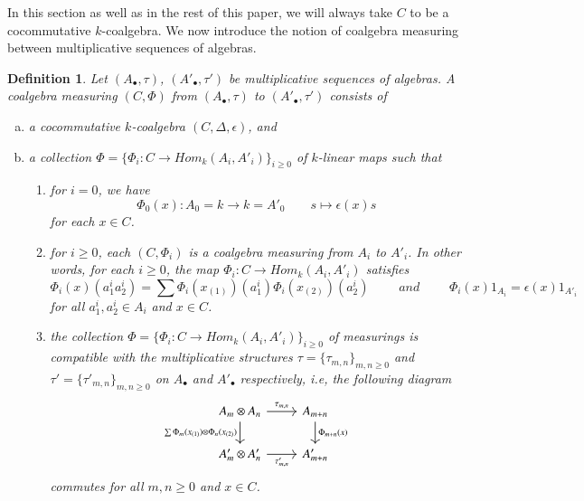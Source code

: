 \documentclass[10pt, colorlinks]{article}
\numberwithin{equation}{section} \DeclareMathSizes{2}{10}{12}{13}
\newtheorem{defn}[thm]{Definition}
\begin{document}
    \smallskip
    In this section as well as in the rest of this paper, we will always take $C$ to be a cocommutative $k$-coalgebra. We now introduce the notion of coalgebra measuring between multiplicative sequences of algebras. 


    \begin{defn}\label{D3.r1}
        Let $(A_\bullet,\tau)$, $(A'_\bullet,\tau')$ be multiplicative sequences of algebras. A coalgebra measuring $(C,\Phi)$ from $(A_\bullet,\tau)$ to $(A'_\bullet,\tau')$ consists of 
        \begin{enumerate}[(a)]
            \item a cocommutative $k$-coalgebra $(C,\Delta,\epsilon)$, and
            \item a collection $\Phi=\{\Phi_i: C\longrightarrow  {Hom}_k(A_i,A'_i)\}_{i\geq 0}$ of $k$-linear maps such that 
            
            \begin{enumerate}[(1)]
            
            
            \item for $i=0$, we have
            \begin{equation}\label{ut}
            \Phi_0(x):A_0=k\longrightarrow k=A'_0\qquad s\mapsto \epsilon(x)s
            \end{equation} for each $x\in C$. 
            
            \item for $i\geq 0$, each $(C,\Phi_i)$ is a coalgebra measuring from $A_i$ to $A'_i$. In other words, for each $i\geq0$, the map $\Phi_i:C\longrightarrow  {Hom}_k(A_i,A'_i)$ satisfies  
            \begin{equation}
                \Phi_i(x)(a^i_1a^i_2)=\sum\Phi_i(x_{(1)})(a^i_1)\Phi_i(x_{(2)})(a^i_2)\qquad\textit{ and }\qquad\Phi_i(x)1_{A_i}=\epsilon(x)1_{A'_i}
            \end{equation}
            for all $a^i_1,a^i_2\in A_i$ and $x\in C$.
            
            \item
              the collection $\Phi=\{\Phi_i:C\longrightarrow  {Hom}_k(A_i,A'_i)\}_{i\geq 0}$ of measurings is compatible with the multiplicative structures $\tau=\{\tau_{m,n}\}_{m,n\geq 0}$ and 
              $\tau'=\{\tau'_{m,n}\}_{m,n\geq 0}$ on $A_\bullet$ and $A'_\bullet$ respectively, i.e, the following diagram
        \begin{equation}
            \begin{tikzcd}\label{diag4}
A_m \otimes A_n
  \arrow[r, "\tau_{m,n}"]
  \arrow[d, "\sum \Phi_m(x_{(1)})\otimes\Phi_n(x_{(2)})"']
&
A_{m+n}
  \arrow[d, "\Phi_{m+n}(x)"]
\\
A'_{m}\otimes A'_n
  \arrow[r, "\tau'_{m,n}"']
&
A'_{m+n}
\end{tikzcd}
        \end{equation}
       commutes for all $m,n\geq 0$ and   $x\in C$. 
       
               \end{enumerate}
               
               \end{enumerate}
 \end{defn}   
\end{document}
